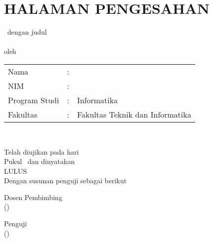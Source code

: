 \chapter*{HALAMAN PENGESAHAN}
\onehalfspacing

\begin{center}
   \type \, dengan judul \\[0.5cm]
    
    \bo{\Judul}  \\[1cm]
    oleh \\[0.5cm]



\noindent
\begin{tabular}{l l p{6cm}}
	Nama&: & \penulis \\
	NIM&: & \nim \\
	Program Studi&: & Informatika \\
	Fakultas &: & Fakultas Teknik dan Informatika \\
\end{tabular} \\

\vspace{1em}


Telah diujikan pada hari \hariTanggalSidang \\
Pukul \waktuSidang \ dan dinyatakan \\
LULUS \\
Dengan susunan penguji sebagai berikut \\


\end{center}

\vspace*{1.0cm}

\noindent
\begin{minipage}{.5\textwidth}
\begin{center}
    Dosen Pembimbing \\[2.5cm]
    
    
    (\pembimbing) \\
    \pembimbingNIDN
\end{center}
  
  
  
\end{minipage}%
\begin{minipage}{.5\textwidth}
\begin{center}
  Penguji \\[2.5cm]
  
  (\penguji)\\
  \pengujiNIDN
    
\end{center}
\end{minipage}

